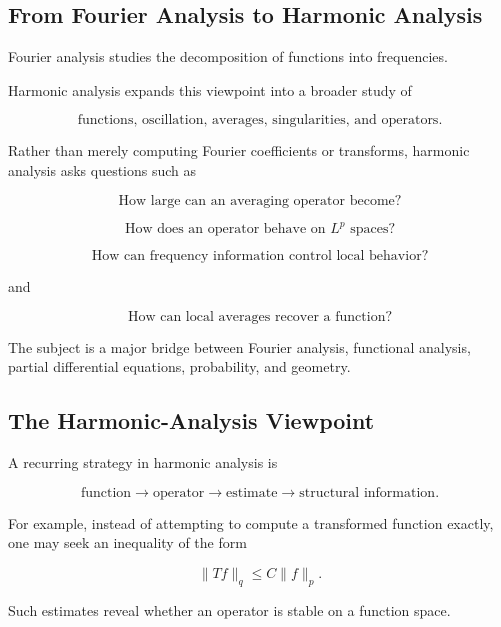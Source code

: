 \subsection{From Fourier Analysis to Harmonic Analysis}
\label{subsec:fourier-to-harmonic}

Fourier analysis studies the decomposition of functions into frequencies.

Harmonic analysis expands this viewpoint into a broader study of

\[
\boxed{
\text{functions, oscillation, averages, singularities, and operators}.
}
\]

Rather than merely computing Fourier coefficients or transforms,
harmonic analysis asks questions such as

\[
\boxed{
\text{How large can an averaging operator become?}
}
\]

\[
\boxed{
\text{How does an operator behave on }L^p\text{ spaces?}
}
\]

\[
\boxed{
\text{How can frequency information control local behavior?}
}
\]

and

\[
\boxed{
\text{How can local averages recover a function?}
}
\]

The subject is a major bridge between Fourier analysis, functional
analysis, partial differential equations, probability, and geometry.

\subsection{The Harmonic-Analysis Viewpoint}
\label{subsec:harmonic-analysis-viewpoint}

A recurring strategy in harmonic analysis is

\[
\boxed{
\text{function}
\longrightarrow
\text{operator}
\longrightarrow
\text{estimate}
\longrightarrow
\text{structural information}.
}
\]

For example, instead of attempting to compute a transformed function
exactly, one may seek an inequality of the form

\[
\boxed{
\|Tf\|_q
\leq
C\|f\|_p.
}
\]

Such estimates reveal whether an operator is stable on a function space.

